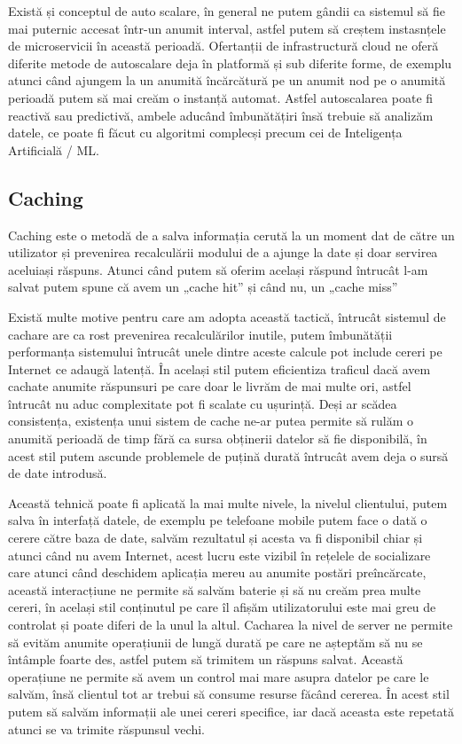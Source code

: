 Există și conceptul de auto scalare, în general ne putem gândii ca sistemul să fie mai puternic
accesat într-un anumit interval, astfel putem să creștem instasnțele de microservicii
în această perioadă. Ofertanții de infrastructură cloud ne oferă diferite metode
de autoscalare deja în platformă și sub diferite forme, de exemplu atunci când ajungem
la un anumită încărcătură pe un anumit nod pe o anumită perioadă putem să mai creăm o
instanță automat. Astfel autoscalarea poate fi reactivă sau predictivă, ambele aducând
îmbunătățiri însă trebuie să analizăm datele, ce poate fi făcut cu algoritmi complecși
precum cei de Inteligența Artificială / ML.

\subsection{Caching}

Caching este o metodă de a salva informația cerută la un moment dat de către un utilizator
și prevenirea recalculării modului de a ajunge la date și doar servirea aceluiași răspuns.
Atunci când putem să oferim același răspund întrucât l-am salvat putem spune că avem
un „cache hit” și când nu, un „cache miss”

Există multe motive pentru care am adopta această tactică, întrucât sistemul de cachare
are ca rost prevenirea recalculărilor inutile, putem îmbunătății performanța sistemului
întrucât unele dintre aceste calcule pot include cereri pe Internet ce adaugă latență.
În același stil putem eficientiza traficul dacă avem cachate anumite răspunsuri
pe care doar le livrăm de mai multe ori, astfel întrucât nu aduc complexitate pot fi
scalate cu ușurință. Deși ar scădea consistența, existența unui sistem de cache ne-ar putea
permite să rulăm o anumită perioadă de timp fără ca sursa obținerii datelor să fie disponibilă,
în acest stil putem ascunde problemele de puțină durată întrucât avem deja o sursă de date
introdusă.

Această tehnică poate fi aplicată la mai multe nivele, la nivelul clientului, putem salva
în interfață datele, de exemplu pe telefoane mobile putem face o dată o cerere către baza
de date, salvăm rezultatul și acesta va fi disponibil chiar și atunci când nu avem Internet,
acest lucru este vizibil în rețelele de socializare care atunci când deschidem aplicația
mereu au anumite postări preîncărcate, această interacțiune ne permite să salvăm baterie
și să nu creăm prea multe cereri, în același stil conținutul pe care îl afișăm utilizatorului
este mai greu de controlat și poate diferi de la unul la altul. Cacharea la nivel de server
ne permite să evităm anumite operațiunii de lungă durată pe care ne așteptăm să nu se întâmple
foarte des, astfel putem să trimitem un răspuns salvat. Această operațiune ne permite să
avem un control mai mare asupra datelor pe care le salvăm, însă clientul tot ar trebui să consume
resurse făcând cererea. În acest stil putem să salvăm informații ale unei cereri specifice,
iar dacă aceasta este repetată atunci se va trimite răspunsul vechi.

